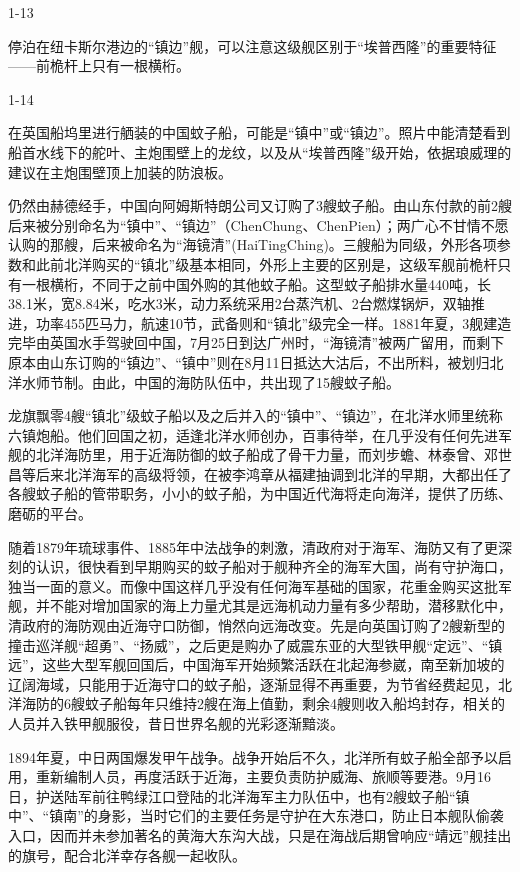 \documentclass[12pt,UTF8]{ctexbook}
\begin{document}
1-13

停泊在纽卡斯尔港边的“镇边”舰，可以注意这级舰区别于“埃普西隆”的重要特征——前桅杆上只有一根横桁。

1-14

在英国船坞里进行舾装的中国蚊子船，可能是“镇中”或“镇边”。照片中能清楚看到船首水线下的舵叶、主炮围壁上的龙纹，以及从“埃普西隆”级开始，依据琅威理的建议在主炮围壁顶上加装的防浪板。

仍然由赫德经手，中国向阿姆斯特朗公司又订购了3艘蚊子船。由山东付款的前2艘后来被分别命名为“镇中”、“镇边”（ChenChung、ChenPien）；两广心不甘情不愿认购的那艘，后来被命名为“海镜清”(HaiTingChing)。三艘船为同级，外形各项参数和此前北洋购买的“镇北”级基本相同，外形上主要的区别是，这级军舰前桅杆只有一根横桁，不同于之前中国外购的其他蚊子船。这型蚊子船排水量440吨，长38.1米，宽8.84米，吃水3米，动力系统采用2台蒸汽机、2台燃煤锅炉，双轴推进，功率455匹马力，航速10节，武备则和“镇北”级完全一样。1881年夏，3舰建造完毕由英国水手驾驶回中国，7月25日到达广州时，“海镜清”被两广留用，而剩下原本由山东订购的“镇边”、“镇中”则在8月11日抵达大沽后，不出所料，被划归北洋水师节制。由此，中国的海防队伍中，共出现了15艘蚊子船。

龙旗飘零4艘“镇北”级蚊子船以及之后并入的“镇中”、“镇边”，在北洋水师里统称六镇炮船。他们回国之初，适逢北洋水师创办，百事待举，在几乎没有任何先进军舰的北洋海防里，用于近海防御的蚊子船成了骨干力量，而刘步蟾、林泰曾、邓世昌等后来北洋海军的高级将领，在被李鸿章从福建抽调到北洋的早期，大都出任了各艘蚊子船的管带职务，小小的蚊子船，为中国近代海将走向海洋，提供了历练、磨砺的平台。

随着1879年琉球事件、1885年中法战争的刺激，清政府对于海军、海防又有了更深刻的认识，很快看到早期购买的蚊子船对于舰种齐全的海军大国，尚有守护海口，独当一面的意义。而像中国这样几乎没有任何海军基础的国家，花重金购买这批军舰，并不能对增加国家的海上力量尤其是远海机动力量有多少帮助，潜移默化中，清政府的海防观由近海守口防御，悄然向远海改变。先是向英国订购了2艘新型的撞击巡洋舰“超勇”、“扬威”，之后更是购办了威震东亚的大型铁甲舰“定远”、“镇远”，这些大型军舰回国后，中国海军开始频繁活跃在北起海参崴，南至新加坡的辽阔海域，只能用于近海守口的蚊子船，逐渐显得不再重要，为节省经费起见，北洋海防的6艘蚊子船每年只维持2艘在海上值勤，剩余4艘则收入船坞封存，相关的人员并入铁甲舰服役，昔日世界名舰的光彩逐渐黯淡。

1894年夏，中日两国爆发甲午战争。战争开始后不久，北洋所有蚊子船全部予以启用，重新编制人员，再度活跃于近海，主要负责防护威海、旅顺等要港。9月16日，护送陆军前往鸭绿江口登陆的北洋海军主力队伍中，也有2艘蚊子船“镇中”、“镇南”的身影，当时它们的主要任务是守护在大东港口，防止日本舰队偷袭入口，因而并未参加著名的黄海大东沟大战，只是在海战后期曾响应“靖远”舰挂出的旗号，配合北洋幸存各舰一起收队。
\end{document}
